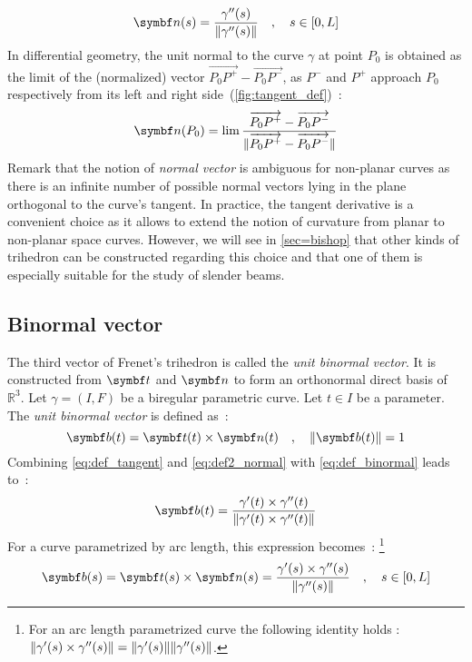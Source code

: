 \begin{equation}
	\vect{n}(s) =  \frac{\gamma''(s)}{\norm{\gamma''(s)}}
	\quad,\quad
	s \in [0,L]
\end{equation}
In differential geometry, the unit normal to the curve $\gamma$ at point $P_0$ is obtained as the limit of the (normalized) vector $\overrightarrow{P_0 P^+}-\overrightarrow{P_0 P^-}$, as $P^-$ and $P^+$ approach $P_0$ respectively from its left and right side~(\cref{fig:tangent_def})~:
\begin{equation}
	\vect{n}(P_0)
	= \lim_{}\frac{\overrightarrow{P_0 P^+}-\overrightarrow{P_0 P^-}}{\norm{\overrightarrow{P_0 P^+}-\overrightarrow{P_0 P^-}}}
\label{eq:3_4_2}
\end{equation}
Remark that the notion of \emph{normal vector} is ambiguous for non-planar curves as there is an infinite number of possible normal vectors lying in the plane orthogonal to the curve's tangent. In practice, the tangent derivative is a convenient choice as it allows to extend the notion of curvature from planar to non-planar space curves. However, we will see in \cref{sec=bishop} that other kinds of trihedron can be constructed regarding this choice and that one of them is especially suitable for the study of slender beams.

\subsection{Binormal vector}
The third vector of Frenet's trihedron is called the \emph{unit binormal vector}. It is constructed from $\vect{t}$ and $\vect{n}$ to form an orthonormal direct basis of $\mathbb{R}^{3}$. 
Let $\gamma = (I,F)$ be a biregular parametric curve. Let $t \in I$ be a parameter. The \emph{unit binormal vector} is defined as~:
\begin{equation}
	\vect{b}(t) = \vect{t}(t) \times \vect{n}(t)
	\quad,\quad
	\norm{\vect{b}(t)}=1
	\label{eq:def_binormal}
\end{equation}
Combining \cref{eq:def_tangent} and \cref{eq:def2_normal} with \cref{eq:def_binormal} leads to~:
\begin{equation}
	\vect{b}(t) = \frac{\gamma'(t) \times \gamma''(t)}{\norm{\gamma'(t) \times \gamma''(t)}}
\end{equation}
For a curve parametrized by arc length, this expression becomes~: \footnote{For an arc length parametrized curve the following identity holds : $\lVert\gamma'(s) \times \gamma''(s)\rVert = \lVert\gamma'(s)\rVert \lVert\gamma''(s)\rVert$.}
\begin{equation}
	\vect{b}(s) = \vect{t}(s) \times \vect{n}(s)
	= \frac{\gamma'(s) \times \gamma''(s)}{\norm{\gamma''(s)}}
	\quad,\quad
	s \in [0,L]
\end{equation}

